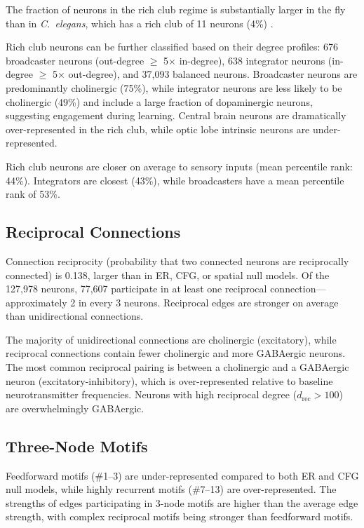 \documentclass{article}
\begin{document}
The fraction of neurons in the rich club regime is substantially larger in the fly than in \textit{C.~elegans}, which has a rich club of 11 neurons (4\%) \citep{towlson2013rich}.

Rich club neurons can be further classified based on their degree profiles: 676 broadcaster neurons (out-degree $\geq$ 5$\times$ in-degree), 638 integrator neurons (in-degree $\geq$ 5$\times$ out-degree), and 37,093 balanced neurons. Broadcaster neurons are predominantly cholinergic (75\%), while integrator neurons are less likely to be cholinergic (49\%) and include a large fraction of dopaminergic neurons, suggesting engagement during learning. Central brain neurons are dramatically over-represented in the rich club, while optic lobe intrinsic neurons are under-represented.

Rich club neurons are closer on average to sensory inputs (mean percentile rank: 44\%). Integrators are closest (43\%), while broadcasters have a mean percentile rank of 53\%.

\subsection{Reciprocal Connections}

Connection reciprocity (probability that two connected neurons are reciprocally connected) is 0.138, larger than in ER, CFG, or spatial null models. Of the 127,978 neurons, 77,607 participate in at least one reciprocal connection---approximately 2 in every 3 neurons. Reciprocal edges are stronger on average than unidirectional connections.

The majority of unidirectional connections are cholinergic (excitatory), while reciprocal connections contain fewer cholinergic and more GABAergic neurons. The most common reciprocal pairing is between a cholinergic and a GABAergic neuron (excitatory-inhibitory), which is over-represented relative to baseline neurotransmitter frequencies. Neurons with high reciprocal degree ($d_\text{rec} > 100$) are overwhelmingly GABAergic.

\subsection{Three-Node Motifs}

Feedforward motifs (\#1--3) are under-represented compared to both ER and CFG null models, while highly recurrent motifs (\#7--13) are over-represented. The strengths of edges participating in 3-node motifs are higher than the average edge strength, with complex reciprocal motifs being stronger than feedforward motifs.
\end{document}
